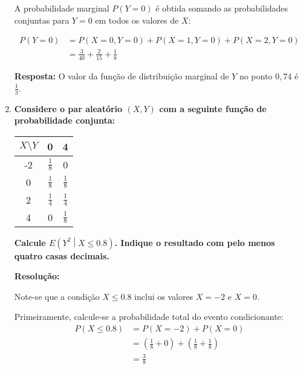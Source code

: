 \documentclass[a4paper,12pt]{article}
\begin{document}
\begin{enumerate}
\begin{mdframed}[backgroundcolor=gray!10, linewidth=0pt, innertopmargin=10pt, innerbottommargin=10pt]
  A probabilidade marginal $P(Y = 0)$ é obtida somando as probabilidades conjuntas para $Y = 0$ em todos os valores de $X$:

  \begin{align*}
    P(Y = 0) &= P(X = 0, Y = 0) + P(X = 1, Y = 0) + P(X = 2, Y = 0) \\
             &= \frac{3}{40} + \frac{2}{15} + \frac{1}{8}
  \end{align*}
  
  \textbf{Resposta:} O valor da função de distribuição marginal de $Y$ no ponto $0,74$ é $\frac{1}{3}$.
  \end{mdframed}

  \vspace{0.5cm}

  \item \textbf{Considere o par aleatório \( (X, Y) \) com a seguinte função de probabilidade conjunta:} 

  \vspace{0.3cm}

  \begin{center}
    \small                      
    \renewcommand{\arraystretch}{1.8}
    \setlength{\tabcolsep}{12pt}
    \begin{tabular}{|c|c|c|}
      \hline
      \( X \setminus Y \) & 0 & 4 \\ \hline
      -2 & \(\frac{1}{8}\) & 0 \\ \hline
      0 & \(\frac{1}{8}\) & \(\frac{1}{8}\) \\ \hline
      2 & \(\frac{1}{4}\) & \(\frac{1}{4}\) \\ \hline
      4 & 0 & \(\frac{1}{8}\) \\ \hline
    \end{tabular}
  \end{center}

  \textbf{Calcule \( E\left( Y^2 \middle| X \leq 0.8 \right) \). Indique o resultado com pelo menos quatro casas decimais.}

  \vspace{0.3cm}

  \begin{mdframed}[backgroundcolor=gray!10, linewidth=0pt, innertopmargin=10pt, innerbottommargin=10pt]
  \textbf{Resolução:}
  
  Note-se que a condição \( X \leq 0.8 \) inclui os valores \( X = -2 \) e \( X = 0 \). 
  
  Primeiramente, calcule-se a probabilidade total do evento condicionante:
  \begin{align*}
    P(X \leq 0.8) &= P(X = -2) + P(X = 0) \\
    &= \left(\frac{1}{8} + 0\right) + \left(\frac{1}{8} + \frac{1}{8}\right) \\
    &= \frac{3}{8}
  \end{align*}


\end{mdframed}
\end{enumerate}
\end{document}
